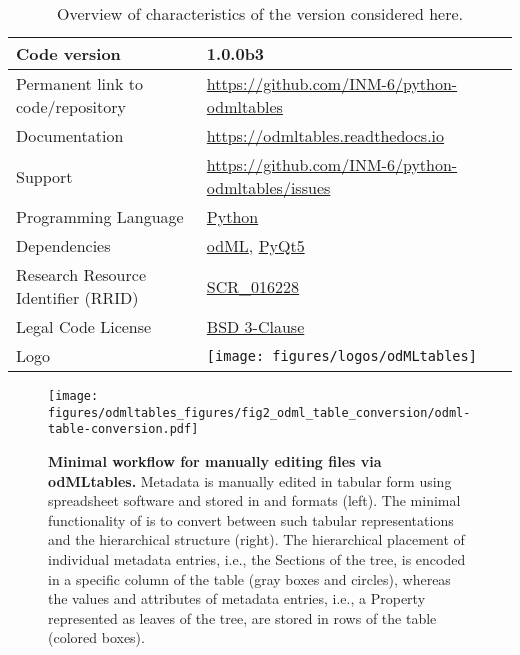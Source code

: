 \begin{table}[]
\small
\begin{tabular}{ll}
\hline
Code version & 1.0.0b3 \\
\hline
Permanent link to code/repository & \href{https://github.com/INM-6/python-odmltables}{https://github.com/INM-6/python-odmltables}\\
\hline
Documentation & \href{https://odmltables.readthedocs.io}{https://odmltables.readthedocs.io}\\
\hline
Support & \href{https://github.com/INM-6/python-odmltables/issues}{https://github.com/INM-6/python-odmltables/issues}\\
\hline
Programming Language & \href{https://www.python.org/}{Python}\\
\hline
Dependencies & \href{http://g-node.github.io/python-odml/}{odML}, \href{https://wiki.python.org/moin/PyQt}{PyQt5}\\  
\hline
Research Resource Identifier (RRID) & \href{https://scicrunch.org/scicrunch/Resources/record/nlx_144509-1/SCR_016228/resolver}{SCR\_016228}\\
\hline
Legal Code License  & \href{https://github.com/INM-6/python-odmltables/blob/master/LICENSE.txt}{BSD 3-Clause} \\
\hline
Logo &
\texttt{[image: figures/logos/odMLtables]}\\
\hline
\end{tabular}
\caption[Overview of  characteristics]{Overview of  characteristics of the version considered here.}
\label{tab:odmltables_characteristics}
\end{table}


\begin{figure}[]
\begin{center}
\texttt{[image: figures/odmltables\_figures/fig2\_odml\_table\_conversion/odml-table-conversion.pdf]}
\caption[Minimal workflow for manually editing  files via odMLtables]{{\label{fig:min_workflow}
\textbf{Minimal workflow for manually editing  files via odMLtables.} Metadata is manually edited in tabular form using spreadsheet software and stored in  and  formats (left). The minimal functionality of  is to convert between such tabular representations and the hierarchical  structure (right). The hierarchical placement of individual metadata entries, i.e., the Sections of the  tree, is encoded in a specific column of the table (gray boxes and circles), whereas the values and attributes of metadata entries, i.e., a Property represented as leaves of the  tree, are stored in rows of the table (colored boxes).%
}}
\end{center}
\end{figure}

